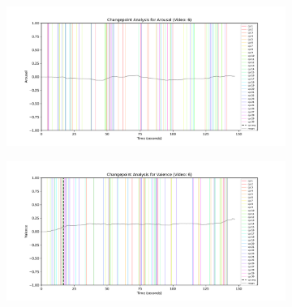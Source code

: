 \documentclass[11pt, letterpaper]{article}
\begin{document}
\begin{figure}
        \centering
    \begin{subfigure}[t]{0.49\textwidth}
        \centering
        \includegraphics[width=\linewidth]{changepoints_V6_arousal_avg} 
        \caption{} \label{fig:changepoints_V6_arousal_avg}
    \end{subfigure}
    \hfill
    \begin{subfigure}[t]{0.49\textwidth}
        \centering
        \includegraphics[width=\linewidth]{changepoints_V6_valence_avg} 
        \caption{} \label{fig:changepoints_V6_valence_avg}
    \end{subfigure}

    \vspace{1cm}
    

\end{figure}
\end{document}
